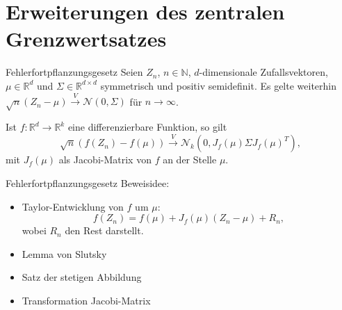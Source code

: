 \section{Erweiterungen des zentralen Grenzwertsatzes}

\begin{defi}{Fehlerfortpflanzungsgesetz}
    Seien $Z_n$, $n \in \mathbb{N}$, $d$-dimensionale Zufallsvektoren, $\mu \in \mathbb{R}^d$ und $\Sigma \in \mathbb{R}^{d \times d}$ symmetrisch und positiv semidefinit.
    Es gelte weiterhin $\sqrt{n}(Z_n - \mu) \xrightarrow{V} \mathcal{N}(0, \Sigma)$ für $n \to \infty$.

    Ist $f: \mathbb{R}^d \to \mathbb{R}^k$ eine differenzierbare Funktion, so gilt
    \[
        \sqrt{n}(f(Z_n) - f(\mu)) \xrightarrow{V} \mathcal{N}_k(0, J_f(\mu) \Sigma J_f(\mu)^T),
    \]
    mit $J_f(\mu)$ als Jacobi-Matrix von $f$ an der Stelle $\mu$.
\end{defi}

\begin{info}{Fehlerfortpflanzungsgesetz}
    Beweisidee:
    \begin{itemize}
        \item Taylor-Entwicklung von $f$ um $\mu$:
              \[
                  f(Z_n) = f(\mu) + J_f(\mu)(Z_n - \mu) + R_n,
              \]
              wobei $R_n$ den Rest darstellt.
        \item Lemma von Slutsky
        \item Satz der stetigen Abbildung
        \item Transformation Jacobi-Matrix
    \end{itemize}
\end{info}

